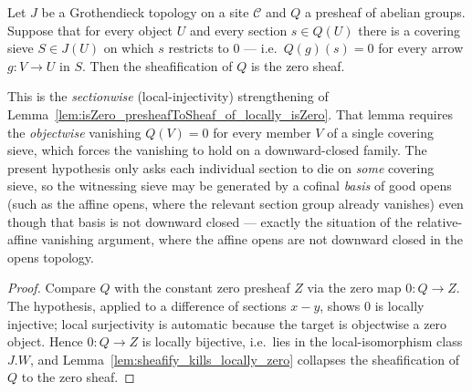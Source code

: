 \begin{lemma}

  \label{lem:isZero_presheafToSheaf_of_sections_locally_zero}
  Let \(J\) be a Grothendieck topology on a site \(\mathcal{C}\) and \(Q\) a presheaf of
  abelian groups. Suppose that for every object \(U\) and every section \(s \in Q(U)\) there
  is a covering sieve \(S \in J(U)\) on which \(s\) restricts to \(0\) --- i.e.\ \(Q(g)(s) =
  0\) for every arrow \(g : V \to U\) in \(S\). Then the sheafification of \(Q\) is the zero
  sheaf.

  This is the \emph{sectionwise} (local-injectivity) strengthening of
  Lemma~\ref{lem:isZero_presheafToSheaf_of_locally_isZero}. That lemma requires the
  \emph{objectwise} vanishing \(Q(V) = 0\) for every member \(V\) of a single covering sieve,
  which forces the vanishing to hold on a downward-closed family. The present hypothesis only
  asks each individual section to die on \emph{some} covering sieve, so the witnessing sieve
  may be generated by a cofinal \emph{basis} of good opens (such as the affine opens, where
  the relevant section group already vanishes) even though that basis is not downward closed
  --- exactly the situation of the relative-affine vanishing argument, where the affine opens
  are not downward closed in the opens topology.
\end{lemma}
\begin{proof}
  \leanok
  Compare \(Q\) with the constant zero presheaf \(Z\) via the zero map \(0 : Q \to Z\). The
  hypothesis, applied to a difference of sections \(x - y\), shows \(0\) is locally injective;
  local surjectivity is automatic because the target is objectwise a zero object. Hence \(0 :
  Q \to Z\) is locally bijective, i.e.\ lies in the local-isomorphism class \(J.W\), and
  Lemma~\ref{lem:sheafify_kills_locally_zero} collapses the sheafification of \(Q\) to the
  zero sheaf.
\end{proof}


